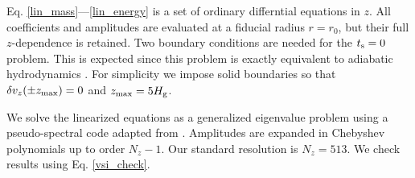 
Eq. \ref{lin_mass}---\ref{lin_energy} is a set of ordinary
differntial equations in $z$. All coefficients and amplitudes are
evaluated at a fiducial radius $r=r_0$, but their full $z$-dependence
is retained.  Two boundary conditions are needed for the $t_\mathrm{s}=0$
problem. This is expected since this problem is exactly equivalent to
 adiabatic hydrodynamics \citep[e.g.][]{lubow93}. For simplicity
we impose solid boundaries so that $\delta v_z(\pm z_\mathrm{max})=0$ and
$z_\mathrm{max}=5H_\mathrm{g}$. 

We solve the linearized equations as a generalized eigenvalue problem 
using a pseudo-spectral code adapted from \cite{lin15}. Amplitudes 
are expanded in Chebyshev polynomials up to order $N_z-1$. Our 
standard resolution is $N_z=513$. We check results using
Eq. \ref{vsi_check}.    





























